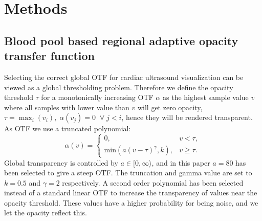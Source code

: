  
 

\section{Methods}
\subsection{Blood pool based regional adaptive opacity transfer function}
Selecting the correct global OTF for cardiac ultrasound visualization can be viewed as a global thresholding problem. Therefore we define the opacity threshold $\tau$ for a monotonically increasing OTF $\alpha$ as the highest sample value $v$ where all samples with lower value than $v$ will get zero opacity, $\tau = \max_{i}(v_i), \; \alpha(v_j)=0 \;\; \forall \; j<i$, hence they will be rendered transparent. 
As OTF we use a truncated polynomial:
\begin{equation}
\alpha(v) = \left\{
	\begin{array}{rl}
		0, &  v < \tau,\\
		\textrm{min}(a(v - \tau)^{\gamma}, k), & v \ge \tau.
	\end{array} \right.
\label{eq:otf}
\end{equation}
Global transparency is controlled by $a\in[0,\infty\rangle$, and in this paper $a=80$ has been selected to give a steep OTF. The truncation and gamma value are set to $k=0.5$ and $\gamma=2$ respectively. A second order polynomial has been selected instead of a standard linear OTF to increase the transparency of values near the opacity threshold. These values have a higher probability for being noise, and we let the opacity reflect this.

